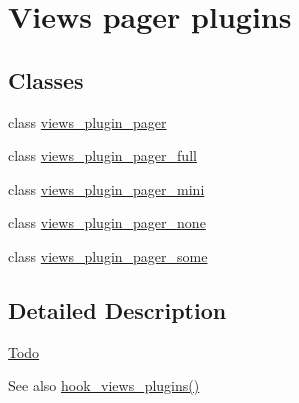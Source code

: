 \hypertarget{group__views__pager__plugins}{
\section{Views pager plugins}
\label{group__views__pager__plugins}
}
\subsection*{Classes}
\begin{DoxyCompactItemize}
\item 
class \hyperlink{classviews__plugin__pager}{views\_\-plugin\_\-pager}
\item 
class \hyperlink{classviews__plugin__pager__full}{views\_\-plugin\_\-pager\_\-full}
\item 
class \hyperlink{classviews__plugin__pager__mini}{views\_\-plugin\_\-pager\_\-mini}
\item 
class \hyperlink{classviews__plugin__pager__none}{views\_\-plugin\_\-pager\_\-none}
\item 
class \hyperlink{classviews__plugin__pager__some}{views\_\-plugin\_\-pager\_\-some}
\end{DoxyCompactItemize}


\subsection{Detailed Description}
\begin{Desc}
\item[\hyperlink{todo__todo000086}{Todo}]\end{Desc}
\begin{DoxySeeAlso}{See also}
\hyperlink{group__views__hooks_ga23f6e9972b2ed84fc54b7ff63f44477d}{hook\_\-views\_\-plugins()} 
\end{DoxySeeAlso}
